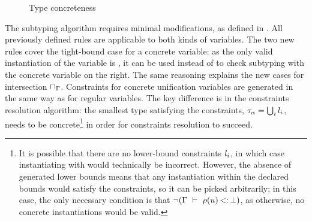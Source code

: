 \begin{figure}[t]
\footnotesize
{}
\caption{Type concreteness}\label{fig:concrete}
\end{figure}

The subtyping algorithm requires minimal modifications, 
as defined in .
All previously defined rules are applicable to both kinds of variables.
The two new rules cover the tight-bound case for a concrete variable: as the only 
valid instantiation of the variable is \tyub, it can be used
instead of \tybot to check subtyping with the concrete variable on the right.
The same reasoning explains the new cases for intersection $\sqcap_\Gamma$.
Constraints for concrete unification variables are generated in the same way
as for regular variables. The key difference is in the constraints resolution
algorithm: the smallest type satisfying the constraints, 
$\tau_{\alpha} = \textstyle\bigcup_i l_i$,
needs to be concrete\footnote{
    It is possible that there are no lower-bound constraints $l_i$,
    in which case instantiating \va with \tybot would technically be incorrect.
    However, the absence of generated lower bounds means that any instantiation
    within the declared bounds would satisfy the constraints, so it can 
    be picked arbitrarily; in this case,
    the only necessary condition is that
    $\lnot (\Gamma\ \vdash\ \rho(u) \operatorname{<:} \bot)$,
    as otherwise, no concrete instantiations would be valid.
} in order for constraints resolution to succeed.

